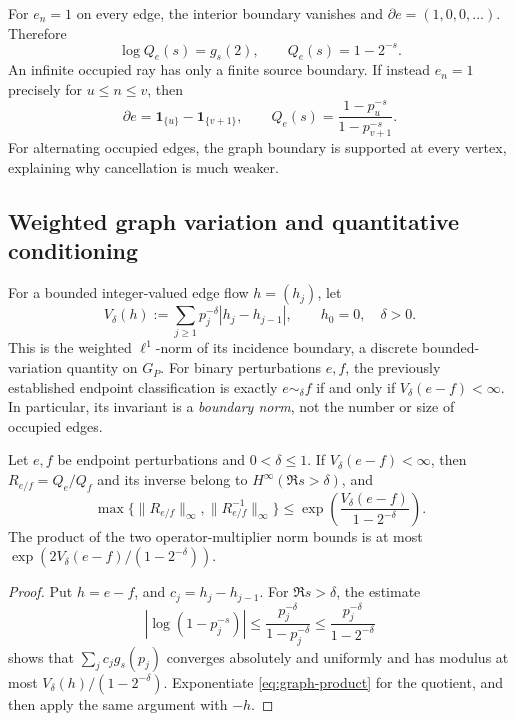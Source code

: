 For \(e_n=1\) on every edge, the interior boundary vanishes and
\(\partial e=(1,0,0,\ldots)\).  Therefore
\[
 \log Q_e(s)=g_s(2),\qquad Q_e(s)=1-2^{-s}.
\]
An infinite occupied ray has only a finite source boundary.  If instead
\(e_n=1\) precisely for \(u\le n\le v\), then
\[
 \partial e=\mathbf 1_{\{u\}}-\mathbf 1_{\{v+1\}},
 \qquad Q_e(s)=\frac{1-p_u^{-s}}{1-p_{v+1}^{-s}}.
\]
For alternating occupied edges, the graph boundary is supported at
every vertex, explaining why cancellation is much weaker.

\subsection{Weighted graph variation and quantitative conditioning}

For a bounded integer-valued edge flow \(h=(h_j)\), let
\begin{equation}\label{eq:graph-TV}
 V_\delta(h):=\sum_{j\ge1}p_j^{-\delta}
                  |h_j-h_{j-1}|,\qquad h_0=0,\quad\delta>0.
\end{equation}
This is the weighted \(\ell^1\)-norm of its incidence boundary,
a discrete bounded-variation quantity on \(G_P\).
For binary perturbations \(e,f\), the previously established endpoint
classification is exactly \(e\sim_\delta f\) if and only if
\(V_\delta(e-f)<\infty\).  In particular, its invariant is a
\emph{boundary norm}, not the number or size of occupied edges.

\begin{proposition}
\label{prop:graph-conditioning}
Let \(e,f\) be endpoint perturbations and \(0<\delta\le1\).
If \(V_\delta(e-f)<\infty\), then
\(R_{e/f}=Q_e/Q_f\) and its inverse belong to
\(H^\infty(\Re s>\delta)\), and
\begin{equation}\label{eq:graph-stability}
 \max\{\|R_{e/f}\|_\infty,\|R_{e/f}^{-1}\|_\infty\}
 \le \exp\!\left(\frac{V_\delta(e-f)}{1-2^{-\delta}}\right).
\end{equation}
The product of the two operator-multiplier norm bounds is at most
\(\exp(2V_\delta(e-f)/(1-2^{-\delta}))\).
\end{proposition}
\begin{proof}
Put \(h=e-f\), and \(c_j=h_j-h_{j-1}\).
For \(\Re s>\delta\), the estimate
\[
 |\log(1-p_j^{-s})|
 \le \frac{p_j^{-\delta}}{1-p_j^{-\delta}}
 \le \frac{p_j^{-\delta}}{1-2^{-\delta}}
\]
shows that \(\sum_j c_jg_s(p_j)\) converges absolutely and uniformly
and has modulus at most
\(V_\delta(h)/(1-2^{-\delta})\).
Exponentiate \eqref{eq:graph-product} for the quotient, and then
apply the same argument with \(-h\).
\end{proof}

